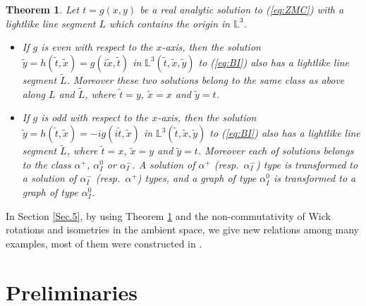 \documentclass[12pt,amstex]{amsart}%
\theoremstyle{plain} %
\newtheorem{theor}{Theorem}
\theoremstyle{definition}
\begin{document}
\begin{theor}\label{maintheorem2}
Let $t=g(x,y)$ be a real analytic solution to (\ref{eq:ZMC}) with a lightlike line segment $L$ which contains the origin in $\mathbb{L}^3$.
\begin{itemize}
\item[(i)] If $g$ is even with respect to the $x$-axis, then the solution $\tilde{y}=h(\tilde{t},\tilde{x})=g(i\tilde{x},\tilde{t})$ in $\mathbb{L}^3(\tilde{t},\tilde{x},\tilde{y})$ to (\ref{eq:BI}) also has a lightlike line segment $\tilde{L}$. Moreover these two solutions belong to the same class as above along $L$ and $\tilde{L}$, where $\tilde{t}=y$, $\tilde{x}=x$ and $\tilde{y}=t$.
\item[(ii)] If $g$ is odd with respect to the $x$-axis, then the solution $\tilde{y}=h(\tilde{t},\tilde{x})=-ig(i\tilde{t},\tilde{x})$ in $\mathbb{L}^3(\tilde{t},\tilde{x},\tilde{y})$ to (\ref{eq:BI}) also has a lightlike line segment $\tilde{L}$, where $\tilde{t}=x$, $\tilde{x}=y$ and $\tilde{y}=t$. Moreover each of solutions belongs to the class $\alpha^+$, $\alpha^0_{I}$ or $\alpha^-_{I}$. A solution of $\alpha^+$ (resp.\ $\alpha^-_{I}$) type is transformed to a solution of $\alpha^-_{I}$ (resp.\ $\alpha^+$) types, and a graph of type $\alpha^0_{I}$ is transformed to a graph of type $\alpha^0_{I}$.
\end{itemize}
\end{theor}
In Section \ref{Sec.5}, by using Theorem \ref{maintheorem2} and the non-commutativity of Wick rotations and isometries in the ambient space, we give new relations among many examples, most of them were constructed in \cite{FujimoriETAL1}.

\section{Preliminaries\label{Sec.2}}
\end{document}
